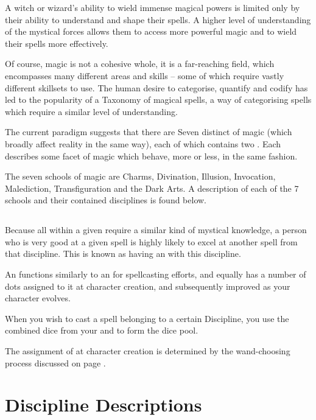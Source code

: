 A witch or wizard's ability to wield immense magical powers is limited only by their ability to understand and shape their spells. A higher level of understanding of the mystical forces allows them to access more powerful magic and to wield their spells more effectively. 

Of course, magic is not a cohesive whole, it is a far-reaching field, which encompasses many different areas and skills -- some of which require vastly different skillsets to use. The human desire to categorise, quantify and codify has led to the popularity of a Taxonomy of magical spells, a way of categorising spells which require a similar level of understanding. 

The current paradigm suggests that there are Seven distinct  of magic (which broadly affect reality in the same way), each of which contains two . Each  describes some facet of magic which behave, more or less, in the same fashion.

The seven schools of magic are Charms, Divination, Illusion, Invocation, Malediction, Transfiguration and the Dark Arts. A description of each of the 7 schools and their contained disciplines is found below.

\subsection{}\label{S:Affinities}
Because all  within a given  require a similar kind of mystical knowledge, a person who is very good at a given  spell is highly likely to excel at another spell from that discipline. This is known as having an  with this discipline. 

An  functions similarly to an  for spellcasting efforts, and equally has a number of dots assigned to it at character creation, and subsequently improved as your character evolves. 

When you wish to cast a spell belonging to a certain Discipline, you use the combined dice from your  and  to form the dice pool. 

The assignment of  at character creation is determined by the wand-choosing process discussed on page \pageref{S:Wandchoosing}.


\section{Discipline Descriptions}\label{S:DiscDescs}

